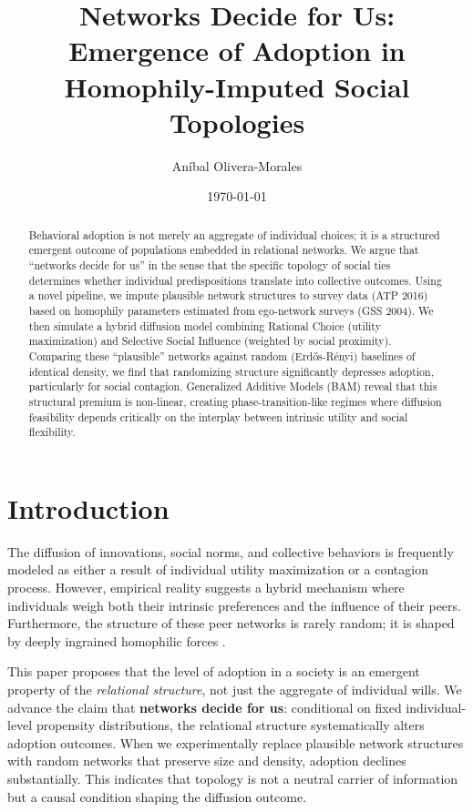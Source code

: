\documentclass[11pt, a4paper]{article}
\title{Networks Decide for Us: \\ Emergence of Adoption in Homophily-Imputed Social Topologies}
\author{Aníbal Olivera-Morales}
\affil{Doctoral Program in Social Complexity Sciences, Universidad del Desarrollo, Chile}
\date{\today}
\begin{document}
\maketitle

\begin{abstract}
Behavioral adoption is not merely an aggregate of individual choices; it is a structured emergent outcome of populations embedded in relational networks. We argue that ``networks decide for us'' in the sense that the specific topology of social ties determines whether individual predispositions translate into collective outcomes. Using a novel pipeline, we impute plausible network structures to survey data (ATP 2016) based on homophily parameters estimated from ego-network surveys (GSS 2004). We then simulate a hybrid diffusion model combining Rational Choice (utility maximization) and Selective Social Influence (weighted by social proximity). Comparing these ``plausible'' networks against random (Erdős-Rényi) baselines of identical density, we find that randomizing structure significantly depresses adoption, particularly for social contagion. Generalized Additive Models (BAM) reveal that this structural premium is non-linear, creating phase-transition-like regimes where diffusion feasibility depends critically on the interplay between intrinsic utility and social flexibility.
\end{abstract}

\section{Introduction}
\label{sec:intro}

The diffusion of innovations, social norms, and collective behaviors is frequently modeled as either a result of individual utility maximization or a contagion process. However, empirical reality suggests a hybrid mechanism where individuals weigh both their intrinsic preferences and the influence of their peers. Furthermore, the structure of these peer networks is rarely random; it is shaped by deeply ingrained homophilic forces \citep{McPherson2001}.

This paper proposes that the level of adoption in a society is an emergent property of the \textit{relational structure}, not just the aggregate of individual wills. We advance the claim that \textbf{networks decide for us}: conditional on fixed individual-level propensity distributions, the relational structure systematically alters adoption outcomes. When we experimentally replace plausible network structures with random networks that preserve size and density, adoption declines substantially. This indicates that topology is not a neutral carrier of information but a causal condition shaping the diffusion outcome.
\end{document}

